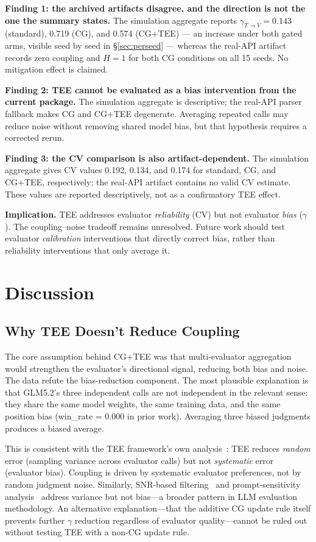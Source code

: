 \documentclass[11pt]{article}
\begin{document}
\textbf{Finding 1: the archived artifacts disagree, and the direction is not the one the summary states.} The simulation aggregate reports $\gamma_{T\to V}=0.143$ (standard), 0.719 (CG), and 0.574 (CG+TEE) --- an increase under both gated arms, visible seed by seed in \S\ref{sec:perseed} --- whereas the real-API artifact records zero coupling and $H=1$ for both CG conditions on all 15 seeds. No mitigation effect is claimed.

\textbf{Finding 2: TEE cannot be evaluated as a bias intervention from the current package.} The simulation aggregate is descriptive; the real-API parser fallback makes CG and CG+TEE degenerate. Averaging repeated calls may reduce noise without removing shared model bias, but that hypothesis requires a corrected rerun.

\textbf{Finding 3: the CV comparison is also artifact-dependent.} The simulation aggregate gives CV values 0.192, 0.134, and 0.174 for standard, CG, and CG+TEE, respectively; the real-API artifact contains no valid CV estimate. These values are reported descriptively, not as a confirmatory TEE effect.

\textbf{Implication.} TEE addresses evaluator \textit{reliability} (CV) but not evaluator \textit{bias} ($\gamma$). The coupling--noise tradeoff remains unresolved. Future work should test evaluator \textit{calibration} interventions that directly correct bias, rather than reliability interventions that only average it.

\section{Discussion}

\subsection{Why TEE Doesn't Reduce Coupling}

The core assumption behind CG+TEE was that multi-evaluator aggregation would strengthen the evaluator's directional signal, reducing both bias and noise. The data refute the bias-reduction component. The most plausible explanation is that GLM5.2's three independent calls are not independent in the relevant sense: they share the same model weights, the same training data, and the same position bias (win\_rate = 0.000 in prior work). Averaging three biased judgments produces a biased average.

This is consistent with the TEE framework's own analysis~\cite{messing2026tee}: TEE reduces \textit{random} error (sampling variance across evaluator calls) but not \textit{systematic} error (evaluator bias). Coupling is driven by systematic evaluator preferences, not by random judgment noise. Similarly, SNR-based filtering~\cite{heineman2025snr} and prompt-sensitivity analysis~\cite{sclar2024quantifying} address variance but not bias---a broader pattern in LLM evaluation methodology. An alternative explanation---that the additive CG update rule itself prevents further $\gamma$ reduction regardless of evaluator quality---cannot be ruled out without testing TEE with a non-CG update rule.
\end{document}
